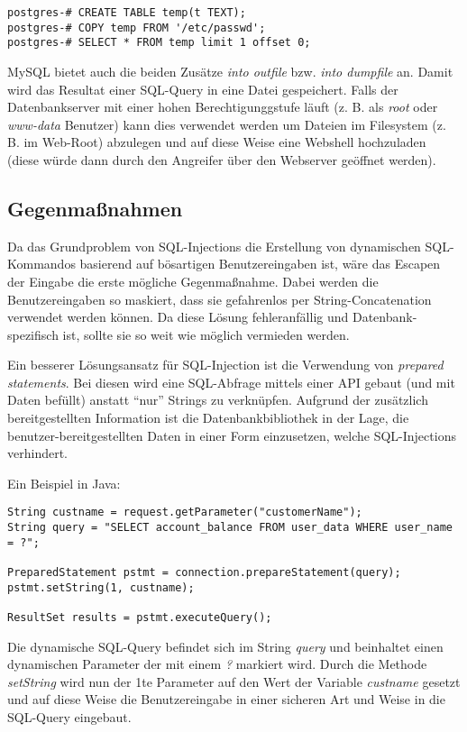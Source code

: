 \begin{verbatim}
postgres-# CREATE TABLE temp(t TEXT);
postgres-# COPY temp FROM '/etc/passwd';
postgres-# SELECT * FROM temp limit 1 offset 0;
\end{verbatim}

MySQL bietet auch die beiden Zusätze \textit{into outfile} bzw. \textit{into dumpfile} an. Damit wird das Resultat einer SQL-Query in eine Datei gespeichert. Falls der Datenbankserver mit einer hohen Berechtigunggstufe läuft (z. B. als \textit{root} oder \textit{www-data} Benutzer) kann dies verwendet werden um Dateien im Filesystem (z. B. im Web-Root) abzulegen und auf diese Weise eine Webshell hochzuladen (diese würde dann durch den Angreifer über den Webserver geöffnet werden).

\subsection{Gegenmaßnahmen}

Da das Grundproblem von SQL-Injections die Erstellung von dynamischen SQL-Kommandos basierend auf bösartigen Benutzereingaben ist, wäre das Escapen der Eingabe die erste mögliche Gegenmaßnahme. Dabei werden die Benutzereingaben so maskiert, dass sie gefahrenlos per String-Concatenation verwendet werden können. Da diese Lösung fehleranfällig und Datenbank-spezifisch ist, sollte sie so weit wie möglich vermieden werden.

Ein besserer Lösungsansatz für SQL-Injection ist die Verwendung von \textit{prepared statements}. Bei diesen wird eine SQL-Abfrage mittels einer API gebaut (und mit Daten befüllt) anstatt ``nur'' Strings zu verknüpfen. Aufgrund der zusätzlich bereitgestellten Information ist die Datenbankbibliothek in der Lage, die benutzer-bereitgestellten Daten in einer Form einzusetzen, welche SQL-Injections verhindert.

Ein Beispiel in Java:

\begin{verbatim}
String custname = request.getParameter("customerName");
String query = "SELECT account_balance FROM user_data WHERE user_name = ?";

PreparedStatement pstmt = connection.prepareStatement(query);
pstmt.setString(1, custname);

ResultSet results = pstmt.executeQuery();
\end{verbatim}

Die dynamische SQL-Query befindet sich im String \textit{query} und beinhaltet einen dynamischen Parameter der mit einem \textit{?} markiert wird. Durch die Methode \textit{setString} wird nun der 1te Parameter auf den Wert der Variable \textit{custname} gesetzt und auf diese Weise die Benutzereingabe in einer sicheren Art und Weise in die SQL-Query eingebaut.


